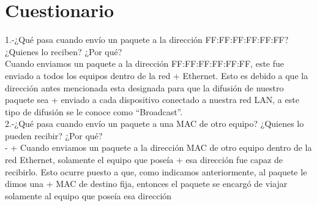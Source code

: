 \documentclass{udpreport}
\begin{document}
	\section{Cuestionario}
	
	  1.-¿Qué pasa cuando envío un paquete a la dirección FF:FF:FF:FF:FF:FF? ¿Quienes
	     lo reciben? ¿Por qué?\\
	  
	     Cuando enviamos un paquete a la dirección FF:FF:FF:FF:FF:FF, este fue enviado a todos los equipos dentro de la red
 +	     Ethernet. Esto es debido a que la dirección antes mencionada esta designada para que la difusión de nuestro paquete sea
 +	     enviado a cada dispositivo conectado a nuestra red LAN, a este tipo de difusión se le conoce como “Broadcast”.\\
 
  	  2.-¿Qué pasa cuando envío un paquete a una MAC de otro equipo? ¿Quienes lo
  	      pueden recibir? ¿Por qué?\\
 -	      
 +	      Cuando enviamos un paquete a la dirección MAC de otro equipo dentro de la red Ethernet, solamente el equipo que poseía
 +	      esa dirección fue capaz de recibirlo. Esto ocurre puesto a que, como indicamos anteriormente, al paquete le dimos una
 +	      MAC de destino fija, entonces el paquete se encargó de viajar solamente al equipo que poseía esa dirección\\
 
\end{document}
